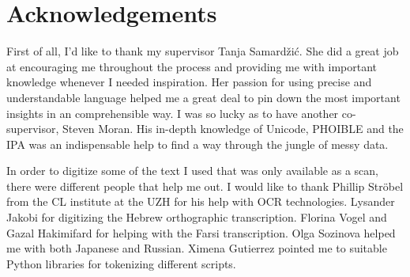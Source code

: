 {}
\chapter*{Acknowledgements}
First of all, I'd like to thank my supervisor Tanja Samardžić. She did a great job at encouraging me throughout the process and providing me with important knowledge whenever I needed inspiration. Her passion for using precise and understandable language helped me a great deal to pin down the most important insights in an comprehensible way. I was so lucky as to have another co-supervisor, Steven Moran. His in-depth knowledge of Unicode, PHOIBLE and the IPA was an indispensable help to find a way through the jungle of messy data.

In order to digitize some of the text I used that was only available as a scan, there were different people that help me out. I would like to thank Phillip Ströbel from the CL institute at the UZH for his help with OCR technologies. Lysander Jakobi for digitizing the Hebrew orthographic transcription. Florina Vogel and Gazal Hakimifard for helping with the Farsi transcription. Olga Sozinova helped me with both Japanese and Russian. Ximena Gutierrez pointed me to suitable Python libraries for tokenizing different scripts.

\newpage